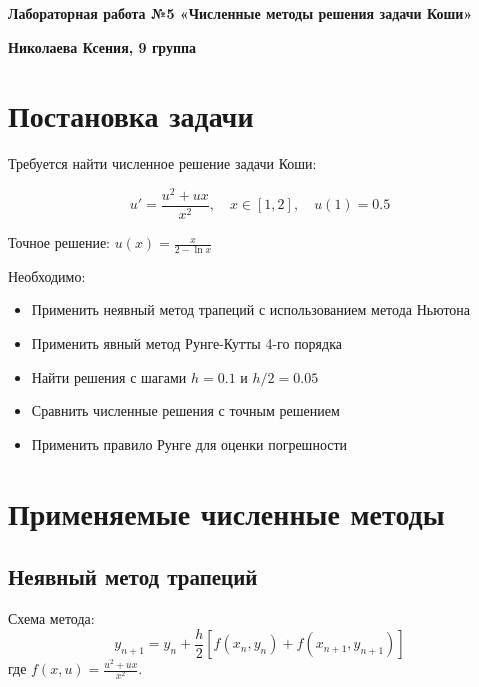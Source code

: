 \documentclass[12pt,a4paper]{article}
\begin{document}
\begin{titlepage}
    \begin{center}
        \vspace*{\fill}
        
        \textbf{\LARGE Лабораторная работа №5
«Численные методы решения задачи Коши»}
        
        \vspace{0.5cm}
        
        \textbf{\Large  Николаева Ксения, 9 группа}
        \vfill
        
    \end{center}
\end{titlepage}

\tableofcontents
\newpage

\section{Постановка задачи}
Требуется найти численное решение задачи Коши:

\begin{equation*}
u' = \frac{u^2 + ux}{x^2}, \quad x \in [1,2], \quad u(1) = 0.5
\end{equation*}

Точное решение: $u(x) = \frac{x}{2 - \ln x}$

Необходимо:
\begin{itemize}
\item Применить неявный метод трапеций с использованием метода Ньютона
\item Применить явный метод Рунге-Кутты 4-го порядка
\item Найти решения с шагами $h = 0.1$ и $h/2 = 0.05$
\item Сравнить численные решения с точным решением
\item Применить правило Рунге для оценки погрешности
\end{itemize}

\section{Применяемые численные методы}

\subsection{Неявный метод трапеций}
Схема метода:
\begin{equation*}
y_{n+1} = y_n + \frac{h}{2}[f(x_n, y_n) + f(x_{n+1}, y_{n+1})]
\end{equation*}
где $f(x, u) = \frac{u^2 + ux}{x^2}$.
\end{document}
